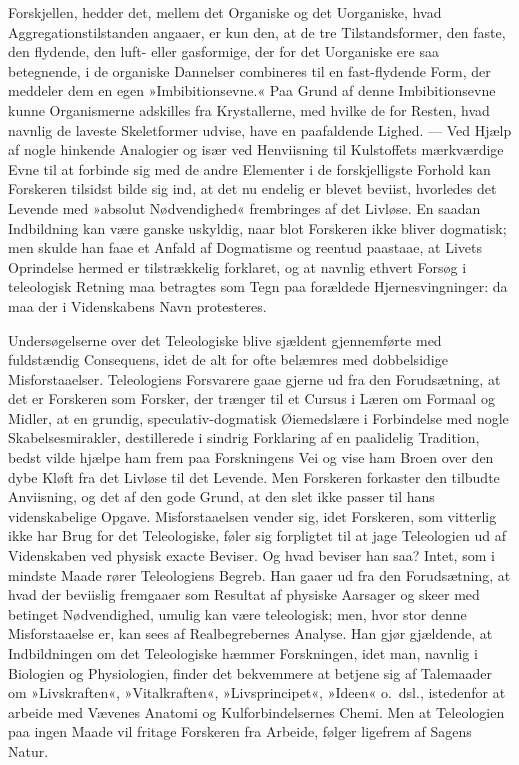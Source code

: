 \documentclass[12pt]{book}
\newcommand{\apage}[1]{\marginnote{\footnotesize\textit{[#1]}}}
\begin{document}
Forskjellen, hedder det, mellem det Organiske og det Uorganiske, hvad
Aggregationstilstanden angaaer, er kun den, at de tre Tilstandsformer, den
faste, den flydende, den luft- eller gasformige, der for det Uorganiske
ere saa betegnende, i de organiske Dannelser combineres til en
fast-flydende Form, der meddeler dem en egen »Imbibitionsevne.« Paa Grund
af denne Imbibitionsevne kunne Organismerne adskilles fra Krystallerne, med
hvilke de for Resten, hvad navnlig de laveste Skeletformer udvise, have en
paafaldende Lighed. --- Ved Hjælp af nogle hinkende Analogier og især ved
Henviisning til Kulstoffets mærkværdige Evne til at forbinde sig med de
andre Elementer i de forskjelligste Forhold kan Forskeren tilsidst bilde
sig ind, at det nu endelig er blevet beviist, hvorledes det Levende med
»absolut Nødvendighed« frembringes af det Livløse. En saadan Indbildning
kan være ganske uskyldig, naar blot Forskeren ikke bliver dogmatisk; men
skulde han faae et Anfald af Dogmatisme og reentud paastaae, at Livets
Oprindelse hermed er tilstrækkelig forklaret, og at navnlig ethvert Forsøg
i teleologisk Retning maa betragtes som Tegn paa forældede
Hjernesvingninger: da maa der i Videnskabens Navn protesteres.

Undersøgelserne over det Teleologiske blive sjældent gjennemførte med
fuldstændig Consequens, idet de alt for ofte belæmres med dobbelsidige  \apage{174}
Misforstaaelser. Teleologiens Forsvarere gaae gjerne ud fra den
Forudsætning, at det er Forskeren som Forsker, der trænger til et Cursus i
Læren om Formaal og Midler, at en grundig, speculativ-dogmatisk
Øiemedslære i Forbindelse med nogle Skabelsesmirakler, destillerede i
sindrig Forklaring af en paalidelig Tradition, bedst vilde hjælpe ham frem
paa Forskningens Vei og vise ham Broen over den dybe Kløft fra det Livløse
til det Levende. Men Forskeren forkaster den tilbudte Anviisning, og det af
den gode Grund, at den slet ikke passer til hans videnskabelige Opgave.
Misforstaaelsen vender sig, idet Forskeren, som vitterlig ikke har Brug for
det Teleologiske, føler sig forpligtet til at jage Teleologien ud af
Videnskaben ved physisk exacte Beviser. Og hvad beviser han saa? Intet, som
i mindste Maade rører Teleologiens Begreb. Han gaaer ud fra den
Forudsætning, at hvad der beviislig fremgaaer som Resultat af physiske
Aarsager og skeer med betinget Nødvendighed, umulig kan være teleologisk;
men, hvor stor denne Misforstaaelse er, kan sees af Realbegrebernes
Analyse. Han gjør gjældende, at Indbildningen om det Teleologiske hæmmer
Forskningen, idet man, navnlig i Biologien og Physiologien, finder det
bekvemmere at betjene sig af Talemaader om »Livskraften«, »Vitalkraften«,
»Livsprincipet«, »Ideen« o.\ dsl., istedenfor at arbeide med Vævenes
Anatomi og Kulforbindelsernes Chemi. Men at Teleologien paa ingen Maade vil
fritage Forskeren fra Arbeide, følger ligefrem af Sagens Natur.
\end{document}
